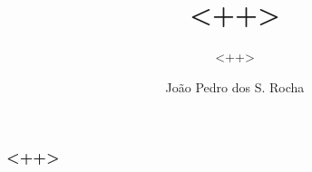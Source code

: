 \documentclass{beamer}
\title{<++>}
\subtitle{<++>}
\author{João Pedro dos S. Rocha}
\institute{INSTITUTO}
\date{}
\begin{document}
	\begin{frame}

	\begin{figure}
	\centering
	\end{figure}
	\maketitle
	\end{frame}

	\begin{frame}
		\frametitle{<++>}
	\end{frame}
\end{document}
